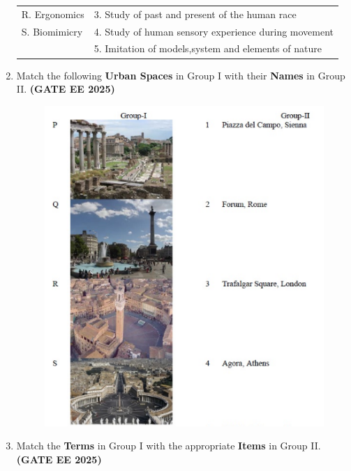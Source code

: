 \documentclass[journal,12pt,onecolumn]{IEEEtran}
\theoremstyle{remark}
\begin{document}
\begin{enumerate}
\begin{tabular}{p{}p{}}
R. Ergonomics  & 3. Study of past and present of the human race\\
S. Biomimicry  & 4. Study of human sensory experience during movement\\
      & 5. Imitation of models,system and elements of nature\\
\end{tabular}
\begin{enumerate}
\end{enumerate}
\item Match the following \textbf{Urban Spaces} in Group I with their \textbf{Names} in Group II. \hfill \textbf{(GATE EE 2025)}
\begin{figure}[H]
    \centering
    \includegraphics[width=0.5\linewidth]{figs/fig2.png}
    \caption{}
    \label{fig2}
\end{figure}
\begin{enumerate}
\end{enumerate}
\item Match the \textbf{Terms} in Group I with the appropriate \textbf{Items} in Group II.\hfill \textbf{(GATE EE 2025)}\\

\end{enumerate}
\end{document}
